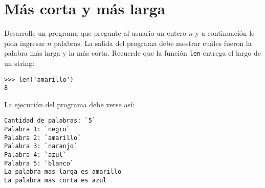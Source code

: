 \section{Más corta y más larga}

Desarrolle un programa que pregunte al usuario un entero \(n\)
y a continuación le pida ingresar \(n\) palabras.
La salida del programa debe mostrar cuáles fueron la palabra más larga y la más corta.
Recuerde que la función \lstinline!len! entrega el largo de un string:
\begin{lstlisting}
>>> len('amarillo')
8
\end{lstlisting}
La ejecución del programa debe verse así:
\begin{lstlisting}[language=testcase]
Cantidad de palabras: `5`
Palabra 1: `negro`
Palabra 2: `amarillo`
Palabra 3: `naranjo`
Palabra 4: `azul`
Palabra 5: `blanco`
La palabra mas larga es amarillo
La palabra mas corta es azul
\end{lstlisting}


